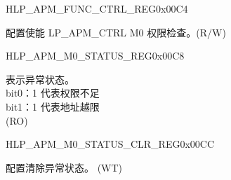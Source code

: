 \begin{register}{H}{LP\_APM\_FUNC\_CTRL\_REG}{0x00C4}\label{regdesc:LPAPMFUNCCTRLREG}
%
%
\regnewline%
\begin{regdesc}\begin{reglist}
\label{fielddesc:LPAPMM0FUNCEN}\item [LP\_APM\_M0\_FUNC\_EN] 配置使能 LP\_APM\_CTRL M0 权限检查。(R/W)
\end{reglist}\end{regdesc}
\end{register}


\begin{register}{H}{LP\_APM\_M0\_STATUS\_REG}{0x00C8}\label{regdesc:LPAPMM0STATUSREG}
%
%
\regnewline%
\begin{regdesc}\begin{reglist}
\label{fielddesc:LPAPMM0EXCEPTIONSTATUS}\item [LP\_APM\_M0\_EXCEPTION\_STATUS] 表示异常状态。\\ 
bit0：1 代表权限不足 \\
bit1：1 代表地址越限  \\ (RO)
\end{reglist}\end{regdesc}
\end{register}


\begin{register}{H}{LP\_APM\_M0\_STATUS\_CLR\_REG}{0x00CC}\label{regdesc:LPAPMM0STATUSCLRREG}
%
%
\regnewline%
\begin{regdesc}\begin{reglist}
\label{fielddesc:LPAPMM0REGIONSTATUSCLR}\item [LP\_APM\_M0\_REGION\_STATUS\_CLR] 配置清除异常状态。 (WT)
\end{reglist}\end{regdesc}
\end{register}



